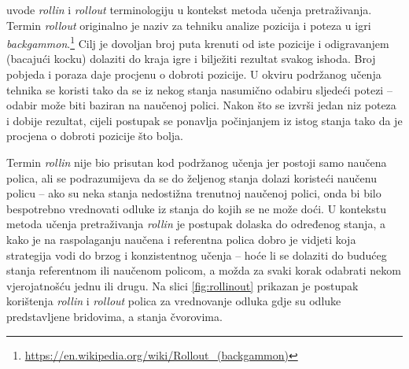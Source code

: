 \citet*{daume15lols} uvode \textit{rollin} i \textit{rollout} terminologiju u
kontekst metoda učenja pretraživanja. Termin \textit{rollout} originalno je
naziv za tehniku analize pozicija i poteza u igri
\textit{backgammon}.\footnote{\url{https://en.wikipedia.org/wiki/Rollout_(backgammon)}}
Cilj je dovoljan broj puta krenuti od iste pozicije i odigravanjem (bacajući
kocku) dolaziti do kraja igre i bilježiti rezultat svakog ishoda. Broj pobjeda i
poraza daje procjenu o dobroti pozicije. U okviru podržanog učenja tehnika se
koristi tako da se iz nekog stanja nasumično odabiru sljedeći potezi -- odabir
može biti baziran na naučenoj polici. Nakon što se izvrši jedan niz poteza i
dobije rezultat, cijeli postupak se ponavlja počinjanjem iz istog stanja tako da
je procjena o dobroti pozicije što bolja.

Termin \textit{rollin} nije bio prisutan kod podržanog učenja jer postoji samo
naučena polica, ali se podrazumijeva da se do željenog stanja dolazi koristeći
naučenu policu -- ako su neka stanja nedostižna trenutnoj naučenoj polici, onda
bi bilo bespotrebno vrednovati odluke iz stanja do kojih se ne može doći. U
kontekstu metoda učenja pretraživanja \textit{rollin} je postupak dolaska do
određenog stanja, a kako je na raspolaganju naučena i referentna polica dobro je
vidjeti koja strategija vodi do brzog i konzistentnog učenja -- hoće li se
dolaziti do budućeg stanja referentnom ili naučenom policom, a možda za svaki
korak odabrati nekom vjerojatnošću jednu ili drugu. Na slici \ref{fig:rollinout}
prikazan je postupak korištenja \textit{rollin} i \textit{rollout} polica za
vrednovanje odluka gdje su odluke predstavljene bridovima, a stanja čvorovima.


